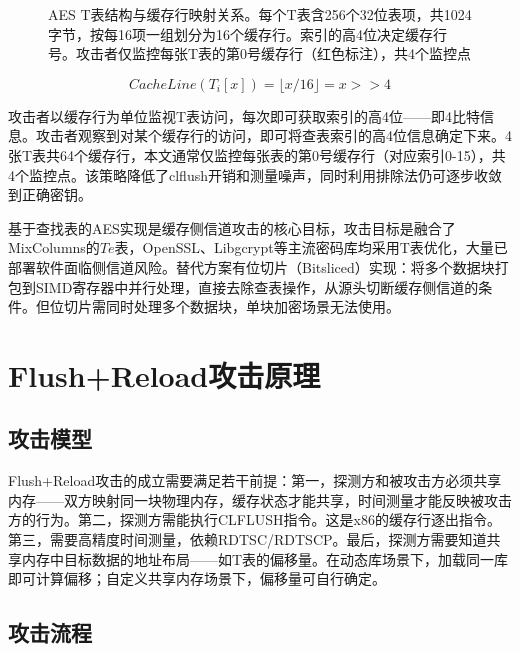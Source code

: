\begin{figure}[htbp]
    \caption{AES T表结构与缓存行映射关系。每个T表含256个32位表项，共1024字节，按每16项一组划分为16个缓存行。索引的高4位决定缓存行号。攻击者仅监控每张T表的第0号缓存行（红色标注），共4个监控点}
    \label{fig:ttable_cache_mapping}
\end{figure}

\begin{equation}
CacheLine(T_i[x]) = \lfloor x / 16 \rfloor = x >> 4
\end{equation}

攻击者以缓存行为单位监视T表访问，每次即可获取索引的高4位——即4比特信息。攻击者观察到对某个缓存行的访问，即可将查表索引的高4位信息确定下来。4张T表共64个缓存行，本文通常仅监控每张表的第0号缓存行（对应索引0-15），共4个监控点。该策略降低了clflush开销和测量噪声，同时利用排除法仍可逐步收敛到正确密钥。

基于查找表的AES实现是缓存侧信道攻击的核心目标，攻击目标是融合了MixColumns的$Te$表，OpenSSL、Libgcrypt等主流密码库均采用T表优化，大量已部署软件面临侧信道风险。替代方案有位切片（Bitsliced）实现：将多个数据块打包到SIMD寄存器中并行处理，直接去除查表操作，从源头切断缓存侧信道的条件。但位切片需同时处理多个数据块，单块加密场景无法使用。

\section{Flush+Reload攻击原理}

\subsection{攻击模型}

Flush+Reload攻击的成立需要满足若干前提：第一，探测方和被攻击方必须共享内存——双方映射同一块物理内存，缓存状态才能共享，时间测量才能反映被攻击方的行为。第二，探测方需能执行CLFLUSH指令。这是x86的缓存行逐出指令。第三，需要高精度时间测量，依赖RDTSC/RDTSCP。最后，探测方需要知道共享内存中目标数据的地址布局——如T表的偏移量。在动态库场景下，加载同一库即可计算偏移；自定义共享内存场景下，偏移量可自行确定。

\subsection{攻击流程}

